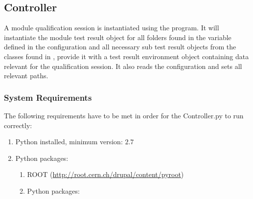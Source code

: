\documentclass[0_Bericht]{subfiles}
\begin{document}
		\subsection{Controller}
			A module qualification session is instantiated using the  program.
			It will instantiate the module test result object for all folders found in the  variable defined in the configuration and all necessary sub test result objects from the classes found in , provide it with a test result environment object containing data relevant for the qualification session. It also reads the configuration and sets all relevant paths.
			\subsubsection{System Requirements}
				The following requirements have to be met in order for the Controller.py to run correctly:
				\begin{enumerate}
					\item Python installed, minimum version: $2.7$
					\item Python packages:
						\begin{enumerate}
							\item ROOT (\url{http://root.cern.ch/drupal/content/pyroot})
							\item Python packages:
								
						\end{enumerate}
				\end{enumerate}
			
\end{document}
